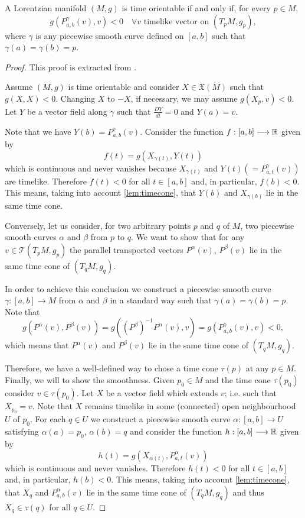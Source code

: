 \begin{corollary}
	\label{cor:timeorientable2}
	A Lorentzian manifold $(M,g)$ is time orientable if and only if, for every $p \in M$,
	\[
		g(P^\gamma_{a,b}(v), v) < 0 \quad \forall v \textrm{ timelike vector on } (T_pM, g_p),
	\]
	where $\gamma$ is any piecewise smooth curve defined on $[a,b]$ such that $\gamma(a) = \gamma(b) = p$.
\end{corollary}

\begin{proof}
	This proof is extracted from \cite[p. 202]{romero10}.
	
	Assume $(M,g)$ is time orientable and consider $X \in \mathfrak{X}(M)$ such that $g(X,X)<0$. Changing $X$ to $-X$, if necessary, we may assume $g(X_p,v)<0$. Let $Y$ be a vector field along $\gamma$ such that $\frac{DY}{dt}=0$ and $Y(a)=v$.
	
	Note that we have $Y(b)=P_{a,b}^{\gamma}(v)$. Consider the function $f : [a,b] \longrightarrow \mathbb{R}$ given by
	\[
		f(t)= g(X_{\gamma(t)},Y(t))
	\]
	which is continuous and never vanishes because $X_{\gamma(t)}$ and $Y(t)(=P_{a,t}^{\gamma}(v))$ are timelike. Therefore $f(t)<0$ for all $t\in [a,b]$ and, in particular, $f(b)<0$. This means, taking into account \autoref{lem:timecone}, that $Y(b)$ and $X_{\gamma(b)}$ lie in the same time cone.
	
	Conversely, let us consider, for two arbitrary points $p$ and $q$ of $M$, two piecewise smooth curves $\alpha$ and $\beta$ from $p$ to $q$. We want to show that for any $v\in \mathcal{T}(T_pM,g_p)$ the parallel transported vectors $P^{\alpha}(v)$, $P^{\beta}(v)$ lie in the same time cone of $(T_qM,g_q)$.
	
	In order to achieve this conclusion we construct a piecewise smooth curve $\gamma : [a,b] \longrightarrow M$ from $\alpha$ and $\beta$ in a standard way such that $\gamma(a)=\gamma(b)=p$. Note that $$g(P^{\alpha}(v),P^{\beta}(v))=g((P^{\beta})^{-1}P^{\alpha}(v),v)=g(P_{a,b}^{\gamma}(v),v)<0,$$ which means that $P^{\alpha}(v)$ and $P^{\beta}(v)$ lie in the same time cone of $(T_qM,g_q)$.
	
	Therefore, we have a well-defined way to chose a time cone $\tau(p)$ at any $p \in M$. Finally, we will to show the smoothness. Given $p_0 \in M$ and the time cone $\tau(p_0)$ consider $v \in \tau(p_0)$. Let $X$ be a vector field which extends $v$; i.e. such that $X_{p_{0}}=v$. Note that $X$ remains timelike in some (connected) open neighbourhood $U$ of $p_0$. For each $q \in U$ we construct a piecewise smooth curve $\alpha : [a,b] \longrightarrow U$ satisfying $\alpha(a)=p_0$,
	$\alpha(b)=q$ and consider the function $h : [a,b] \longrightarrow \mathbb{R}$ given by
	\[
		h(t)=g(X_{\alpha(t)},P_{a,t}^{\alpha}(v))
	\]
	which is continuous and never vanishes. Therefore $h(t)<0$ for all $t\in [a,b]$ and, in particular, $h(b)<0$. This means, taking into account \autoref{lem:timecone}, that $X_q$ and $P_{a,b}^{\alpha}(v)$ lie in the same time cone of $(T_qM,g_q)$ and thus $X_q \in \tau(q)$ for all $q \in U$.
\end{proof}

